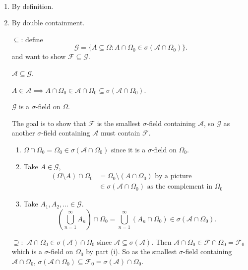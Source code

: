 \documentclass[class=article,crop=false]{standalone}
\begin{document}
\begin{prf}
~\begin{enumerate}[label=(\roman*)]
	\item By definition.
	\item By double containment. 

		$ \subseteq $: define
		\[
			\mathcal{G} = \{A \subseteq \Omega: A \cap  \Omega_0 \in \sigma(\mathcal{A} \cap  \Omega_0)\} 
		.\] 
		and want to show $ \mathcal{F} \subseteq \mathcal{G}$.
		\begin{claim}[]
		$ \mathcal{A} \subseteq \mathcal{G}$.
		\end{claim}
		$ A \in \mathcal{A} \implies A \cap \Omega_0 \in \mathcal{A} \cap \Omega_0 \subseteq \sigma(\mathcal{A} \cap \Omega_0)$.
		\begin{claim}[]
		$ \mathcal{G}$ is a $\sigma$-field on $ \Omega$.
		\end{claim}
		The goal is to show that $ \mathcal{F}$ is the smallest $\sigma$-field containing $ \mathcal{A}$, so $ \mathcal{G}$ as another $\sigma$-field containing $ \mathcal{A}$ must contain $ \mathcal{F}$. 
		\begin{enumerate}[label=(\roman*)]
			\item $ \Omega \cap \Omega_0 = \Omega_0 \in \sigma(\mathcal{A} \cap \Omega_0)$ since it is a $\sigma$-field on $ \Omega_0$.
			\item Take $ A \in \mathcal{G}$, 
				\begin{align*}
					(\Omega \setminus A) \cap \Omega_0 &= \Omega_0 \setminus (A \cap \Omega_0) \text{ by a picture} \\
									   & \in \sigma(\mathcal{A} \cap \Omega_0) \text{ as the complement in } \Omega_0 
				\end{align*}
			\item Take $ A_1, A_2, \ldots \in \mathcal{G}$.
				\[
					\left( \bigcup_{ n =1}^{\infty} A_n \right) \cap \Omega_0 = \bigcup_{ n =1}^{\infty} (A_n \cap \Omega_0) \in \sigma(\mathcal{A} \cap \Omega_0)
				.\] 
		\end{enumerate}
$ \supseteq :$
$ \mathcal{A} \cap \Omega_0 \in \sigma(\mathcal{A}) \cap \Omega_0$ since $ \mathcal{A} \subseteq \sigma(\mathcal{A}) $. Then $ \mathcal{A} \cap \Omega_0 \in \mathcal{F} \cap \Omega_0 = \mathcal{F}_0$ which is a $\sigma$-field on $ \Omega_0$ by part (i). So as the smallest $\sigma$-field containing $ \mathcal{A} \cap \Omega_0$, $ \sigma(\mathcal{A} \cap \Omega_0) \subseteq \mathcal{F}_0 = \sigma(\mathcal{A}) \cap \Omega_0$.
\end{enumerate}
\end{prf}
\end{document}
